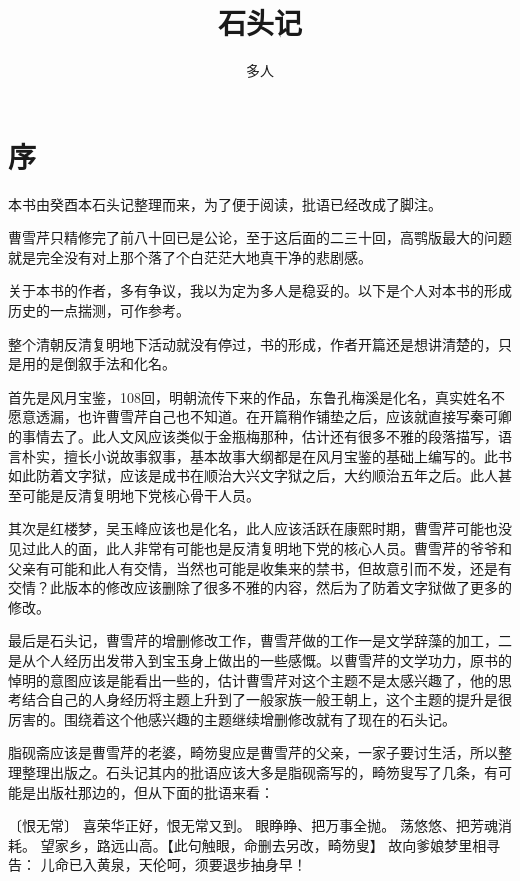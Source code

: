 \documentclass[12pt,oneside]{book}
\title{石头记}
\author{多人}
\begin{document}



\frontmatter 
{}
\chapter*{序}
本书由癸酉本石头记整理而来，为了便于阅读，批语已经改成了脚注。

曹雪芹只精修完了前八十回已是公论，至于这后面的二三十回，高鹗版最大的问题就是完全没有对上那个落了个白茫茫大地真干净的悲剧感。

关于本书的作者，多有争议，我以为定为多人是稳妥的。以下是个人对本书的形成历史的一点揣测，可作参考。

整个清朝反清复明地下活动就没有停过，书的形成，作者开篇还是想讲清楚的，只是用的是倒叙手法和化名。

首先是风月宝鉴，108回，明朝流传下来的作品，东鲁孔梅溪是化名，真实姓名不愿意透漏，也许曹雪芹自己也不知道。在开篇稍作铺垫之后，应该就直接写秦可卿的事情去了。此人文风应该类似于金瓶梅那种，估计还有很多不雅的段落描写，语言朴实，擅长小说故事叙事，基本故事大纲都是在风月宝鉴的基础上编写的。此书如此防着文字狱，应该是成书在顺治大兴文字狱之后，大约顺治五年之后。此人甚至可能是反清复明地下党核心骨干人员。

其次是红楼梦，吴玉峰应该也是化名，此人应该活跃在康熙时期，曹雪芹可能也没见过此人的面，此人非常有可能也是反清复明地下党的核心人员。曹雪芹的爷爷和父亲有可能和此人有交情，当然也可能是收集来的禁书，但故意引而不发，还是有交情？此版本的修改应该删除了很多不雅的内容，然后为了防着文字狱做了更多的修改。

最后是石头记，曹雪芹的增删修改工作，曹雪芹做的工作一是文学辞藻的加工，二是从个人经历出发带入到宝玉身上做出的一些感慨。以曹雪芹的文学功力，原书的悼明的意图应该是能看出一些的，估计曹雪芹对这个主题不是太感兴趣了，他的思考结合自己的人身经历将主题上升到了一般家族一般王朝上，这个主题的提升是很厉害的。围绕着这个他感兴趣的主题继续增删修改就有了现在的石头记。

脂砚斋应该是曹雪芹的老婆，畸笏叟应是曹雪芹的父亲，一家子要讨生活，所以整理整理出版之。石头记其内的批语应该大多是脂砚斋写的，畸笏叟写了几条，有可能是出版社那边的，但从下面的批语来看：


〔恨无常〕
喜荣华正好，恨无常又到。
眼睁睁、把万事全抛。
荡悠悠、把芳魂消耗。
望家乡，路远山高。【此句触眼，命删去另改，畸笏叟】
故向爹娘梦里相寻告：
儿命已入黄泉，天伦呵，须要退步抽身早！
\end{document}
